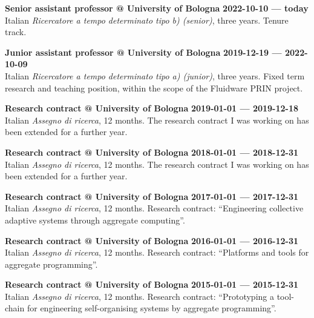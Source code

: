 \textbf{Senior assistant professor @ University of Bologna} \hfill \textbf{2022-10-10 --- today}\\
Italian \emph{Ricercatore a tempo determinato tipo b) (senior)}, three years.
Tenure track.

\halfblankline{}

\textbf{Junior assistant professor @ University of Bologna} \hfill \textbf{2019-12-19 --- 2022-10-09}\\
Italian \emph{Ricercatore a tempo determinato tipo a) (junior)}, three years.
Fixed term research and teaching position,
within the scope of the Fluidware PRIN project.

\halfblankline{}

\textbf{Research contract @ University of Bologna} \hfill \textbf{2019-01-01 --- 2019-12-18}\\
Italian \emph{Assegno di ricerca}, 12 months.
The research contract I was working on has been extended for a further year.

\halfblankline{}

\textbf{Research contract @ University of Bologna} \hfill \textbf{2018-01-01 --- 2018-12-31}\\
Italian \emph{Assegno di ricerca}, 12 months.
The research contract I was working on has been extended for a further year.

\halfblankline{}

\textbf{Research contract @ University of Bologna} \hfill \textbf{2017-01-01 --- 2017-12-31}\\
Italian \emph{Assegno di ricerca}, 12 months.
Research contract: ``Engineering collective adaptive systems through aggregate computing''.

\halfblankline{}

\textbf{Research contract @ University of Bologna} \hfill \textbf{2016-01-01 --- 2016-12-31}\\
Italian \emph{Assegno di ricerca}, 12 months.
Research contract: ``Platforms and tools for aggregate programming''.

\halfblankline{}

\textbf{Research contract @ University of Bologna} \hfill \textbf{2015-01-01 --- 2015-12-31}\\
Italian \emph{Assegno di ricerca}, 12 months.
Research contract: ``Prototyping a tool-chain for engineering self-organising systems by aggregate programming''.

\halfblankline{}

